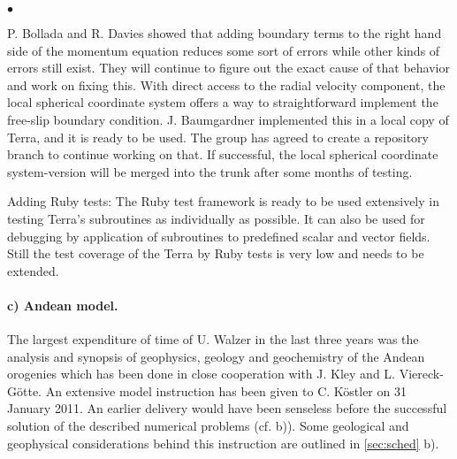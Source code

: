 \documentclass[twoside,10pt]{article}
\newenvironment{dlist}
   {\begin{list}
      {$\bullet$}
      {
      \setlength{\topsep}{0.5ex}
      \setlength{\partopsep}{0.0ex}
      \setlength{\parsep}{0.5ex}
      \setlength{\itemsep}{0.0ex}
      \setlength{\itemindent}{3.0ex}
      \setlength{\leftmargin}{0.0ex}
      \setlength{\labelsep}{1.0ex}
      }
   }
   {\end{list}}
\begin{document}
\begin{dlist}
P. Bollada and R. Davies showed that adding boundary terms to the right hand side of the momentum equation reduces some sort of errors while other kinds of errors still exist.
They will continue to figure out the exact cause of that behavior and work on fixing this. 
With direct access to the radial velocity component, the local spherical coordinate system offers a way to straightforward implement the free-slip boundary condition. 
J. Baumgardner implemented this in a local copy of Terra, and it is ready to be used. 
The group has agreed to create a repository branch to continue working on that. 
If successful, the local spherical coordinate system-version will be merged into the trunk after some months of testing.
 \item Adding Ruby tests: 
The Ruby test framework is ready to be used extensively in testing Terra's subroutines as individually as possible.
It can also be used for debugging by application of subroutines to predefined scalar and vector fields.
Still the test coverage of the Terra by Ruby tests is very low and needs to be extended.
\end{dlist}

\paragraph{c) Andean model.}
The largest expenditure of time of U. Walzer in the last three years was the analysis and synopsis of geophysics, geology and geochemistry of the Andean orogenies which has been done in close cooperation with J. Kley and L. Viereck-G\"otte.
An extensive model instruction has been given to C. K\"ostler on 31 January 2011. 
An earlier delivery would have been senseless before the successful solution of the described numerical problems (cf. b)).
Some geological and geophysical considerations behind this instruction are outlined in \ref{sec:sched} b).
\end{document}

